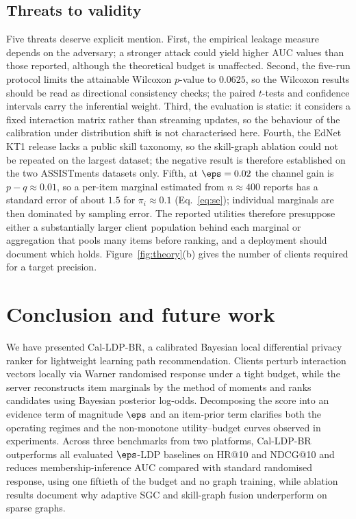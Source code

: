 \subsection{Threats to validity}

Five threats deserve explicit mention. First, the empirical leakage measure depends on the adversary; a stronger attack could yield higher AUC values than those reported, although the theoretical budget is unaffected. Second, the five-run protocol limits the attainable Wilcoxon $p$-value to $0.0625$, so the Wilcoxon results should be read as directional consistency checks; the paired $t$-tests and confidence intervals carry the inferential weight. Third, the evaluation is static: it considers a fixed interaction matrix rather than streaming updates, so the behaviour of the calibration under distribution shift is not characterised here. Fourth, the EdNet KT1 release lacks a public skill taxonomy, so the skill-graph ablation could not be repeated on the largest dataset; the negative result is therefore established on the two ASSISTments datasets only. Fifth, at $\eps=0.02$ the channel gain is $p-q\approx0.01$, so a per-item marginal estimated from $n\approx400$ reports has a standard error of about $1.5$ for $\pi_i\approx0.1$ (Eq.~\eqref{eq:se}); individual marginals are then dominated by sampling error. The reported utilities therefore presuppose either a substantially larger client population behind each marginal or aggregation that pools many items before ranking, and a deployment should document which holds. Figure~\ref{fig:theory}(b) gives the number of clients required for a target precision.

\section{Conclusion and future work}\label{sec:conclusion}

We have presented Cal-LDP-BR, a calibrated Bayesian local differential privacy ranker for lightweight learning path recommendation. Clients perturb interaction vectors locally via Warner randomised response under a tight budget, while the server reconstructs item marginals by the method of moments and ranks candidates using Bayesian posterior log-odds. Decomposing the score into an evidence term of magnitude $\eps$ and an item-prior term clarifies both the operating regimes and the non-monotone utility--budget curves observed in experiments. Across three benchmarks from two platforms, Cal-LDP-BR outperforms all evaluated $\eps$-LDP baselines on HR@10 and NDCG@10 and reduces membership-inference AUC compared with standard randomised response, using one fiftieth of the budget and no graph training, while ablation results document why adaptive SGC and skill-graph fusion underperform on sparse graphs.

